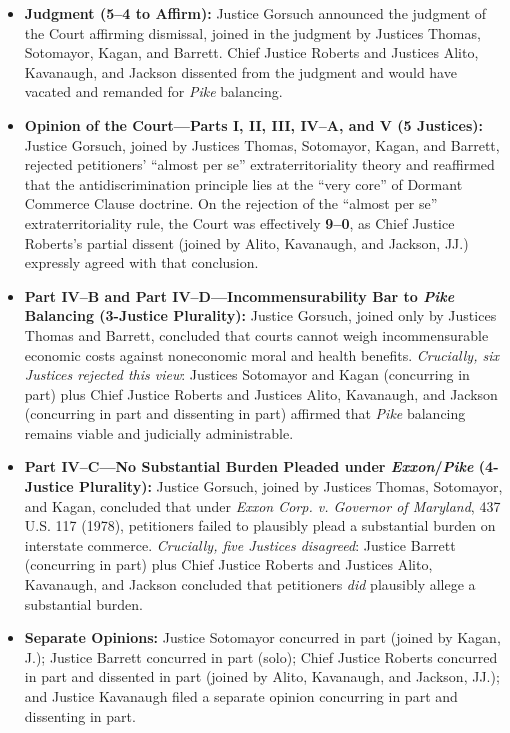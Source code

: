 \documentclass[12pt]{article}
\begin{document}
\begin{itemize}
\item \textbf{Judgment (5--4 to Affirm):} Justice Gorsuch announced the judgment of the Court affirming dismissal, joined in the judgment by Justices Thomas, Sotomayor, Kagan, and Barrett. Chief Justice Roberts and Justices Alito, Kavanaugh, and Jackson dissented from the judgment and would have vacated and remanded for \textit{Pike} balancing.
\item \textbf{Opinion of the Court---Parts I, II, III, IV--A, and V (5 Justices):} Justice Gorsuch, joined by Justices Thomas, Sotomayor, Kagan, and Barrett, rejected petitioners' ``almost per se'' extraterritoriality theory and reaffirmed that the antidiscrimination principle lies at the ``very core'' of Dormant Commerce Clause doctrine. On the rejection of the ``almost per se'' extraterritoriality rule, the Court was effectively \textbf{9--0}, as Chief Justice Roberts's partial dissent (joined by Alito, Kavanaugh, and Jackson, JJ.) expressly agreed with that conclusion.
\item \textbf{Part IV--B and Part IV--D---Incommensurability Bar to \textit{Pike} Balancing (3-Justice Plurality):} Justice Gorsuch, joined only by Justices Thomas and Barrett, concluded that courts cannot weigh incommensurable economic costs against noneconomic moral and health benefits. \textit{Crucially, six Justices rejected this view}: Justices Sotomayor and Kagan (concurring in part) plus Chief Justice Roberts and Justices Alito, Kavanaugh, and Jackson (concurring in part and dissenting in part) affirmed that \textit{Pike} balancing remains viable and judicially administrable.
\item \textbf{Part IV--C---No Substantial Burden Pleaded under \textit{Exxon}/\textit{Pike} (4-Justice Plurality):} Justice Gorsuch, joined by Justices Thomas, Sotomayor, and Kagan, concluded that under \textit{Exxon Corp. v. Governor of Maryland}, 437 U.S. 117 (1978), petitioners failed to plausibly plead a substantial burden on interstate commerce. \textit{Crucially, five Justices disagreed}: Justice Barrett (concurring in part) plus Chief Justice Roberts and Justices Alito, Kavanaugh, and Jackson concluded that petitioners \textit{did} plausibly allege a substantial burden.
\item \textbf{Separate Opinions:} Justice Sotomayor concurred in part (joined by Kagan, J.); Justice Barrett concurred in part (solo); Chief Justice Roberts concurred in part and dissented in part (joined by Alito, Kavanaugh, and Jackson, JJ.); and Justice Kavanaugh filed a separate opinion concurring in part and dissenting in part.
\end{itemize}
\end{document}
